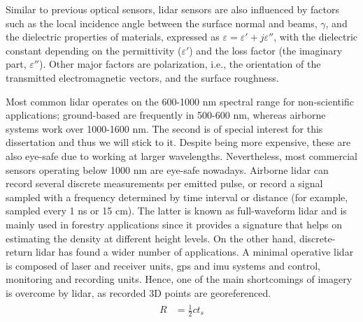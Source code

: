 Similar to previous optical sensors, \acrshort{lidar} sensors are also influenced by factors such as the local incidence angle between the surface normal and beams, $\gamma$, and the dielectric properties of materials, expressed as $\varepsilon = \varepsilon' + j\varepsilon''$, with the dielectric constant depending on the permittivity ($\varepsilon'$) and the loss factor (the imaginary part, $\varepsilon''$). Other major factors are polarization, i.e., the orientation of the transmitted electromagnetic vectors, and the surface roughness.

Most common \acrshort{lidar} operates on the 600-1000 \si{\nano\meter} spectral range for non-scientific applications; ground-based are frequently in 500-600 \si{\nano\meter}, whereas airborne systems work over 1000-1600 \si{\nano\meter}. The second is of special interest for this dissertation and thus we will stick to it. Despite being more expensive, these are also eye-safe due to working at larger wavelengths. Nevertheless, most commercial sensors operating below 1000 \si{\nano\meter} are eye-safe nowadays. Airborne \acrshort{lidar} can record several discrete measurements per emitted pulse, or record a signal sampled with a frequency determined by time interval or distance (for example, sampled every 1 \si{\nano\second} or 15 \si{\centi\meter}). The latter is known as full-waveform \acrshort{lidar} and is mainly used in forestry applications since it provides a signature that helps on estimating the density at different height levels. On the other hand, discrete-return \acrshort{lidar} has found a wider number of applications. A minimal operative \acrshort{lidar} is composed of laser and receiver units, \acrshort{gps} and \acrshort{imu} systems and control, monitoring and recording units. Hence, one of the main shortcomings of imagery is overcome by \acrshort{lidar}, as recorded 3D points are georeferenced. 
\begin{gather}
    \label{eq:lidar_distance}
    \begin{aligned}
        R &= \frac{1}{2}ct_s
    \end{aligned}
\end{gather}

